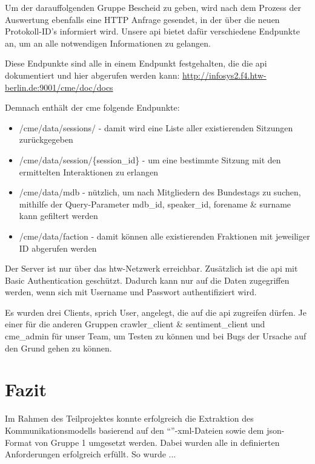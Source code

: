 Um der darauffolgenden Gruppe Bescheid zu geben, wird nach dem Prozess der
Auswertung ebenfalls eine HTTP Anfrage gesendet, in der über die neuen
Protokoll-ID's informiert wird. Unsere \gls{api} bietet dafür verschiedene Endpunkte
an, um an alle notwendigen Informationen zu gelangen.

Diese Endpunkte sind alle in einem Endpunkt festgehalten, die die \gls{api}
dokumentiert und hier abgerufen werden kann:
\url{http://infosys2.f4.htw-berlin.de:9001/cme/doc/docs}

Demnach enthält der \gls{cme} folgende Endpunkte:
\begin{itemize}
    \item /cme/data/sessions/ - damit wird eine Liste aller existierenden
        Sitzungen zurückgegeben
    \item /cme/data/session/\{session\_id\} - um eine bestimmte Sitzung mit den
        ermittelten Interaktionen zu erlangen
    \item /cme/data/mdb - nützlich, um nach Mitgliedern des Bundestags zu
        suchen, mithilfe der Query-Parameter mdb\_id, speaker\_id, forename
        \& surname kann gefiltert werden
    \item /cme/data/faction - damit können alle existierenden Fraktionen mit
        jeweiliger ID abgerufen werden
\end{itemize}

Der Server ist nur über das \gls{htw}-Netzwerk erreichbar. Zusätzlich ist die \gls{api} mit
Basic Authentication geschützt. Dadurch kann nur auf die Daten zugegriffen
werden, wenn sich mit Username und Passwort authentifiziert wird.

Es wurden drei Clients, sprich User, angelegt, die auf die \gls{api} zugreifen
dürfen. Je einer für die anderen Gruppen crawler\_client \& sentiment\_client und
cme\_admin für unser Team, um Testen zu können und bei Bugs der Ursache auf den
Grund gehen zu können.

\section{Fazit}\label{sec:03_05_fazit}

Im Rahmen des Teilprojektes konnte erfolgreich die Extraktion des
Kommunikationsmodells basierend auf den
\enquote{}-\gls{xml}-Dateien sowie dem
\gls{json}-Format von Gruppe 1 umgesetzt werden. Dabei wurden alle in
 definierten Anforderungen erfolgreich erfüllt. So wurde ...

